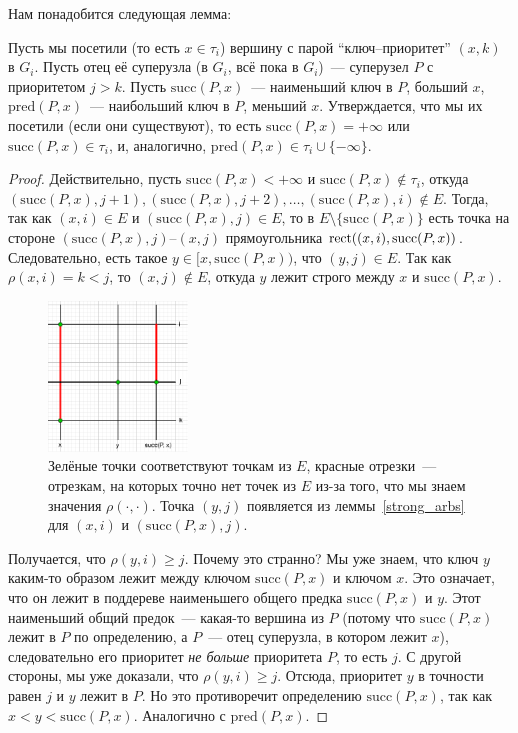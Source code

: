 Нам понадобится следующая лемма:

\begin{lemma}\label{visited_parent}
Пусть мы посетили (то есть $x \in \tau_i$) вершину с парой ``ключ--приоритет'' $(x, k)$ в $G_i$. Пусть отец её суперузла (в $G_i$, всё пока в $G_i$)~--- суперузел $P$ с приоритетом $j > k$. 
Пусть $\mathrm{succ}(P, x)$~--- наименьший ключ в $P$, больший $x$, $\mathrm{pred}(P, x)$~--- наибольший ключ в $P$, меньший $x$.
Утверждается, что мы их посетили (если они существуют), то есть $\mathrm{succ}(P, x) = +\infty$ или $\mathrm{succ}(P, x) \in \tau_i$, и, аналогично, $\mathrm{pred}(P, x) \in \tau_i \cup \{-\infty\}$.
\end{lemma}
\begin{proof}
Действительно, пусть $\mathrm{succ}(P, x) < +\infty$ и $\mathrm{succ}(P, x) \notin \tau_i$, откуда $(\mathrm{succ}(P, x), j + 1), (\mathrm{succ}(P, x), j + 2), \ldots, (\mathrm{succ}(P, x), i) \notin E$. Тогда, так как $(x, i) \in E$ и $(\mathrm{succ}(P, x), j) \in E$, то в $E \setminus \{\mathrm{succ}(P, x)\}$ есть точка на стороне $(\mathrm{succ}(P, x), j)$--$(x,j)$ прямоугольника $\operatorname{rect}((x, i), \mathrm{succ}(P, x))$. Следовательно, есть такое $y \in [x, \mathrm{succ}(P, x))$, что $(y, j) \in E$. Так как $\rho(x, i) = k < j$, то $(x, j) \notin E$, откуда $y$ лежит строго между
$x$ и $\mathrm{succ}(P, x)$. 

\begin{figure}
\includegraphics[height=4cm]{img/lemma_proof_diagram.png}

\caption{Зелёные точки соответствуют точкам из $E$, красные отрезки~--- отрезкам, на которых точно нет точек из $E$ из-за того, что мы знаем значения 
$\rho(\cdot, \cdot)$. Точка $(y, j)$ появляется из леммы~\ref{strong_arbs} для $(x, i)$ и 
$(\mathrm{succ}(P, x), j)$.}
\end{figure}

Получается, что $\rho(y, i) \geqslant j$. Почему это странно? Мы уже знаем, что ключ $y$ каким-то образом лежит между ключом $\mathrm{succ}(P, x)$ и ключом $x$. Это означает, что он лежит в поддереве наименьшего общего предка 
$\mathrm{succ}(P, x)$ и $y$. Этот наименьший общий предок~--- какая-то вершина из $P$ (потому что $\mathrm{succ}(P, x)$ лежит в $P$ по определению, а $P$~--- отец суперузла, в котором лежит $x$), следовательно его приоритет \emph{не больше} приоритета $P$, то есть $j$. С другой стороны, мы уже доказали, что $\rho(y, i) \geqslant j$. Отсюда, приоритет $y$ в точности равен $j$ и $y$ лежит в $P$. Но это противоречит определению $\mathrm{succ}(P, x)$, так как $x < y < \mathrm{succ}(P, x)$. Аналогично с $\mathrm{pred}(P, x)$.

\end{proof}

